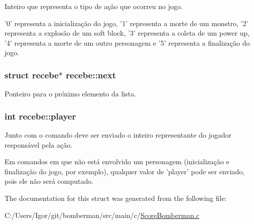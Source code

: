 Inteiro que representa o tipo de ação que ocorreu no jogo. 

'0' representa a inicialização do jogo, '1' representa a morte de um monstro, '2' representa a explosão de um soft block, '3' representa a coleta de um power up, '4' representa a morte de um outro personagem e '5' representa a finalização do jogo. \hypertarget{structrecebe_afd17b6474940eb351c1635212f426597}{
\subsubsection[{next}]{\setlength{\rightskip}{0pt plus 5cm}struct {\bf recebe}$\ast$ recebe\+::next}}\label{structrecebe_afd17b6474940eb351c1635212f426597}


Ponteiro para o próximo elemento da lista. 

\hypertarget{structrecebe_aa3c608135add531f3120b2460e09bff2}{
\subsubsection[{player}]{\setlength{\rightskip}{0pt plus 5cm}int recebe\+::player}}\label{structrecebe_aa3c608135add531f3120b2460e09bff2}


Junto com o comando deve ser enviado o inteiro representante do jogador responsável pela ação. 

Em comandos em que não está envolvido um personagem (inicialização e finalização do jogo, por exemplo), qualquer valor de 'player' pode ser enviado, pois ele não será computado. 

The documentation for this struct was generated from the following file\+:\begin{DoxyCompactItemize}
\item 
C\+:/\+Users/\+Igor/git/bomberman/src/main/c/\hyperlink{_score_bomberman_8c}{Score\+Bomberman.\+c}\end{DoxyCompactItemize}
